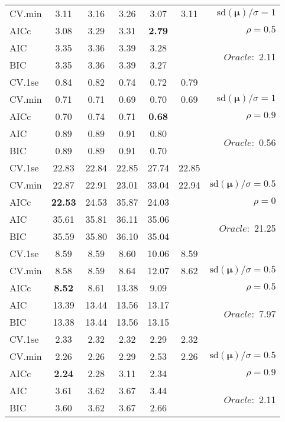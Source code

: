 \begin{table}
\begin{center}
\begin{tabular}{l*{5}{c}|r}
CV.min & 3.11 & 3.16 & 3.26 & 3.07 & 3.11 &  $\mathrm{sd}(\mathbf{\mu})/\sigma=1$ \\
AICc & 3.08 & 3.29 & 3.31 & {\bf 2.79} & & $\rho=0.5$ \\
AIC & 3.35 & 3.36 & 3.39 & 3.28 & &  \multirow{2}{*}{$Oracle: $ 2.11} \\
BIC & 3.35 & 3.36 & 3.39 & 3.27 & &  \\
 \hline 
CV.1se & 0.84 & 0.82 & 0.74 & 0.72 & 0.79 & \\
CV.min & 0.71 & 0.71 & 0.69 & 0.70 & 0.69 &  $\mathrm{sd}(\mathbf{\mu})/\sigma=1$ \\
AICc & 0.70 & 0.74 & 0.71 & {\bf 0.68} & & $\rho=0.9$ \\
AIC & 0.89 & 0.89 & 0.91 & 0.80 & &  \multirow{2}{*}{$Oracle: $ 0.56} \\
BIC & 0.89 & 0.89 & 0.91 & 0.70 & &  \\
 \hline 
CV.1se & 22.83 & 22.84 & 22.85 & 27.74 & 22.85 & \\
CV.min & 22.87 & 22.91 & 23.01 & 33.04 & 22.94 &  $\mathrm{sd}(\mathbf{\mu})/\sigma=0.5$ \\
AICc & {\bf 22.53} & 24.53 & 35.87 & 24.03 & & $\rho=0$ \\
AIC & 35.61 & 35.81 & 36.11 & 35.06 & &  \multirow{2}{*}{$Oracle: $ 21.25} \\
BIC & 35.59 & 35.80 & 36.10 & 35.04 & &  \\
 \hline 
CV.1se & 8.59 & 8.59 & 8.60 & 10.06 & 8.59 & \\
CV.min & 8.58 & 8.59 & 8.64 & 12.07 & 8.62 &  $\mathrm{sd}(\mathbf{\mu})/\sigma=0.5$ \\
AICc & {\bf 8.52} & 8.61 & 13.38 & 9.09 & & $\rho=0.5$ \\
AIC & 13.39 & 13.44 & 13.56 & 13.17 & &  \multirow{2}{*}{$Oracle: $ 7.97} \\
BIC & 13.38 & 13.44 & 13.56 & 13.15 & &  \\
 \hline 
CV.1se & 2.33 & 2.32 & 2.32 & 2.29 & 2.32 & \\
CV.min & 2.26 & 2.26 & 2.29 & 2.53 & 2.26 &  $\mathrm{sd}(\mathbf{\mu})/\sigma=0.5$ \\
AICc & {\bf 2.24} & 2.28 & 3.11 & 2.34 & & $\rho=0.9$ \\
AIC & 3.61 & 3.62 & 3.67 & 3.44 & &  \multirow{2}{*}{$Oracle: $ 2.11} \\
BIC & 3.60 & 3.62 & 3.67 & 2.66 & &  \\
 \hline 
\end{tabular}
\end{center}
\vspace{-1cm}
\end{table}





